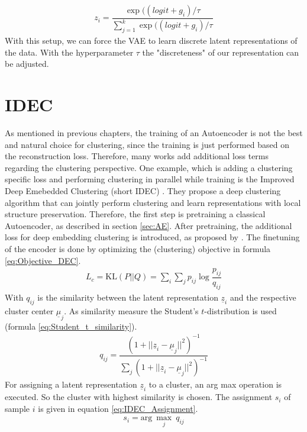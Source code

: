 \documentclass[12pt,DIV14,BCOR12mm,a4paper,footexclude,headinclude,halfparskip-,twoside,openright,openany,cleardoubleempty,idxtotoc,bibtotoc]{scrreprt} %
\numberwithin{equation}{chapter}
\begin{document}
\begin{align}
	z_i = \dfrac{\exp((logit+g_i)/\tau}{\sum_{j=1}^{k}\exp((logit+g_i)/\tau}\label{eq:VAE_GumbelSoftmaxSample}
\end{align}
With this setup, we can force the VAE to learn discrete latent representations of the data. With the hyperparameter $\tau$ the "discreteness" of our representation can be adjusted.
\section{IDEC}
As mentioned in previous chapters, the training of an Autoencoder is not the best and natural choice for clustering, since the training is just performed based on the reconstruction loss. Therefore, many works add additional loss terms regarding the clustering perspective. One example, which is adding a clustering specific loss and performing clustering in parallel while training is the Improved Deep Emebedded Clustering (short IDEC) \cite{Guo17IDEC}. They propose a deep clustering algorithm that can jointly perform clustering and learn representations with local structure preservation. Therefore, the first step is pretraining a classical Autoencoder, as described in section \ref{sec:AE}. After pretraining, the additional loss for deep embedding clustering is introduced, as proposed by \cite{Xie16DEC}. The finetuning of the encoder is done by optimizing the (clustering) objective in formula \ref{eq:Objective_DEC}.
\begin{align}
	L_c = \textrm{KL}(P||Q) = \sum_i\sum_j p_{ij}\log\dfrac{p_{ij}}{q_{ij}}\label{eq:Objective_DEC}
\end{align}
With $q_{ij}$ is the similarity between the latent representation $\underline{z}_i$ and the respective cluster center $\underline{\mu}_j$. As similarity measure the Student's $t$-distribution is used \cite{t-SNE} (formula \ref{eq:Student_t_similarity}).
\begin{align}
	q_{ij}=\dfrac{(1+||\underline{z}_i-\underline{\mu}_j||^2)^{-1}}{\sum_j(1+||\underline{z}_i-\underline{\mu}_j||^2)^{-1}}\label{eq:Student_t_similarity}
\end{align}
For assigning a latent representation $\underline{z}_i$ to a cluster, an arg max operation is executed. So the cluster with highest similarity is chosen. The assignment $s_i$ of sample $i$ is given in equation \ref{eq:IDEC_Assignment}.
\begin{align}
	s_i = \textrm{arg}\ \underset{j}\max\ q_{ij}\label{eq:IDEC_Assignment}
\end{align}
\end{document}
